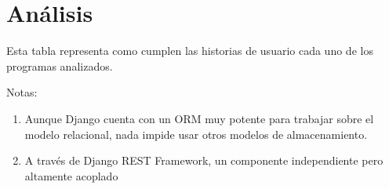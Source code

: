\documentclass[12pt]{report} %
\begin{document}
\section{Análisis}

Esta tabla representa como cumplen las historias de usuario cada uno de los programas analizados.


\begin{table}[ht]
    \caption{Comparativa de características entre diferente software}
    \label{table:comparativa}
\end{table}

Notas:
\begin{enumerate}
    \item Aunque Django cuenta con un ORM muy potente para trabajar sobre el modelo relacional, nada impide usar otros modelos de almacenamiento.
    \item A través de Django REST Framework, un componente independiente pero altamente acoplado
\end{enumerate}
\end{document}
